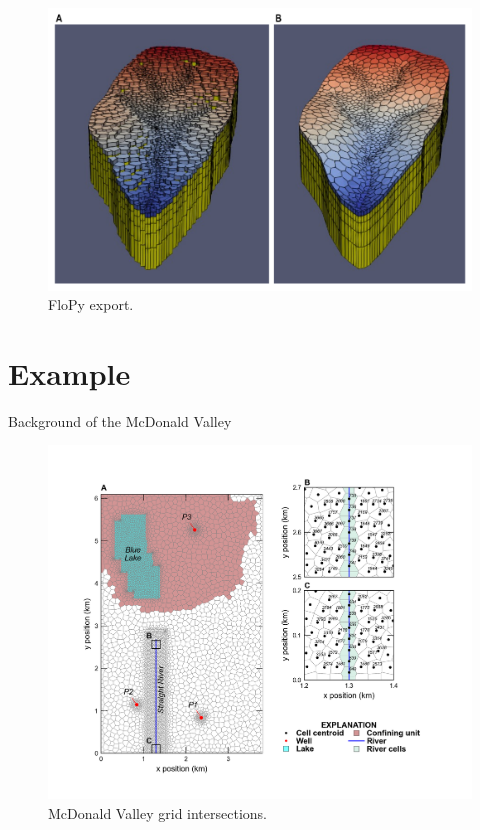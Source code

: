 \documentclass[11pt, oneside]{article}   	%
\begin{document}
\begin{figure}[ht!]
	\begin{center}
		\includegraphics{figures/mf6vtk.pdf}
	\end{center}
	\caption{FloPy export.}
	\label{fig:flopyvtk}
\end{figure}


\section{Example}

Background of the McDonald Valley \citep{hill1998}


\begin{figure}[ht!]
	\begin{center}
		\includegraphics{figures/mv_voronoi_river_discretization.png}
	\end{center}
	\caption{McDonald Valley grid intersections.}
	\label{fig:mvgrid}
\end{figure}
\end{document}
